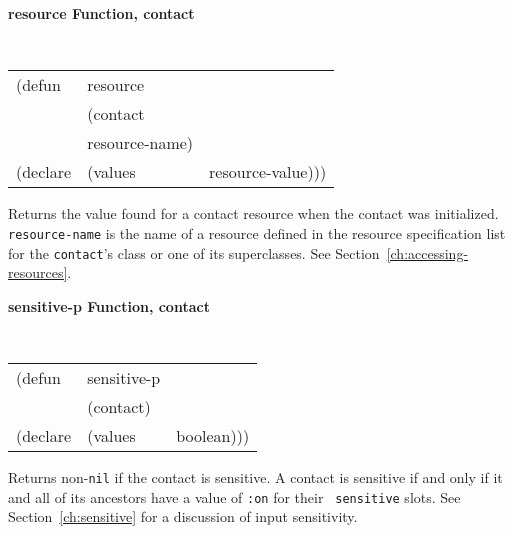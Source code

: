 \documentclass[twoside]{book}
\begin{document}
\begin{sloppy}
\begin{flushright}
{}\end{flushright}


{\samepage
{\large {\bf resource \hfill Function, contact}}
\begin{flushright} \parbox[t]{6.125in}{
\tt
\begin{tabular}{lll}
\raggedright
(defun & resource & \\
& (contact\\
& resource-name) \\
(declare &(values &resource-value)))
\end{tabular}
\rm

}\end{flushright}}

\begin{flushright} \parbox[t]{6.125in}{
Returns the value found for a contact resource when the contact was initialized.
{\tt resource-name} is the name of a resource defined in the resource
specification list for the {\tt contact}'s class or one of its superclasses.
See Section~\ref{ch:accessing-resources}.

}\end{flushright}


{\samepage
{\large {\bf sensitive-p \hfill Function, contact}} 
\begin{flushright} \parbox[t]{6.125in}{
\tt
\begin{tabular}{lll}
\raggedright
(defun & sensitive-p & \\ 
& (contact) \\
(declare &(values  & boolean)))
\end{tabular}
\rm

}\end{flushright}}

\begin{flushright} \parbox[t]{6.125in}{
Returns non-{\tt nil} if the contact is sensitive. 
A contact is sensitive if and
only if it and all of its ancestors have a value  of {\tt :on} for their {\tt
sensitive} slots.
See
Section~\ref{ch:sensitive} for a discussion of input sensitivity.

}\end{flushright}





\end{sloppy}
\end{document}
